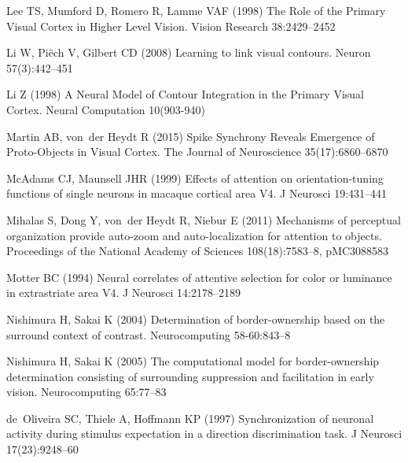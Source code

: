 \begin{thebibliography}{90}
Lee TS, Mumford D, Romero R, Lamme VAF (1998) {T}he {R}ole of the {P}rimary
  {V}isual {C}ortex in {H}igher {L}evel {V}ision. Vision Research 38:2429--2452

Li W, Pi{\"e}ch V, Gilbert CD (2008) {L}earning to link visual contours. Neuron
  57(3):442--451

Li Z (1998) {A} {N}eural {M}odel of {C}ontour {I}ntegration in the {P}rimary
  {V}isual {C}ortex. Neural Computation 10(903-940)

Martin AB, von~der Heydt R (2015) {S}pike {S}ynchrony {R}eveals {E}mergence of
  {P}roto-{O}bjects in {V}isual {C}ortex. The Journal of Neuroscience
  35(17):6860--6870

McAdams CJ, Maunsell JHR (1999) {E}ffects of attention on orientation-tuning
  functions of single neurons in macaque cortical area {V}4. J Neurosci
  19:431--441

Mihalas S, Dong Y, von~der Heydt R, Niebur E (2011) {M}echanisms of perceptual
  organization provide auto-zoom and auto-localization for attention to
  objects. Proceedings of the National Academy of Sciences 108(18):7583--8,
  pMC3088583

Motter BC (1994) {N}eural correlates of attentive selection for color or
  luminance in extrastriate area {V4}. J Neurosci 14:2178--2189

Nishimura H, Sakai K (2004) {D}etermination of border-ownership based on the
  surround context of contrast. Neurocomputing 58-60:843--8

Nishimura H, Sakai K (2005) {T}he computational model for border-ownership
  determination consisting of surrounding suppression and facilitation in early
  vision. Neurocomputing 65:77--83

de~Oliveira SC, Thiele A, Hoffmann KP (1997) {S}ynchronization of neuronal
  activity during stimulus expectation in a direction discrimination task. J
  Neurosci 17(23):9248--60


\end{thebibliography}
